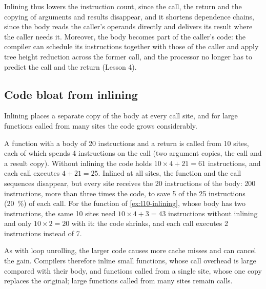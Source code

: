 \documentclass[../main.tex]{subfiles}
\begin{document}
Inlining thus lowers the instruction count, since the call, the return and
the copying of arguments and results disappear, and it shortens dependence
chains, since the body reads the caller's operands directly and delivers its
result where the caller needs it.  Moreover, the body becomes part of the
caller's code: the compiler can schedule its instructions together with those
of the caller and apply tree height reduction across the former call, and the
processor no longer has to predict the call and the return
(Lesson 4).

\subsection{Code bloat from inlining}
\label{sec:l10-inlining-bloat}

Inlining places a separate copy of the body at every call site, and for large
functions called from many sites the code grows considerably.

\begin{example}
  \label{ex:l10-inlining-size}
  A function with a body of 20 instructions and a return is called from 10
  sites, each of which spends 4 instructions on the call (two argument copies,
  the call and a result copy).  Without inlining the code holds $10 \times 4 +
  21 = 61$ instructions, and each call executes $4 + 21 = 25$.  Inlined at all
  sites, the function and the call sequences disappear, but every site
  receives the 20 instructions of the body: 200 instructions, more than three
  times the code, to save 5 of the 25 instructions (\SI{20}{\percent}) of each
  call.  For the function of \cref{ex:l10-inlining}, whose body has two
  instructions, the same 10 sites need $10 \times 4 + 3 = 43$ instructions
  without inlining and only $10 \times 2 = 20$ with it: the code shrinks, and
  each call executes 2 instructions instead of 7.
\end{example}

As with loop unrolling, the larger code causes more cache misses and can
cancel the gain.  Compilers therefore inline small functions, whose call
overhead is large compared with their body, and functions called from a single
site, whose one copy replaces the original; large functions called from many
sites remain calls.
\end{document}
